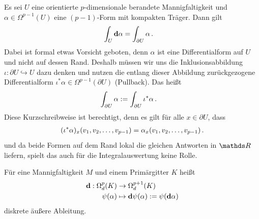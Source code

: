   \begin{satz}
    Es sei \( U \) eine orientierte \( p \)-dimensionale berandete Mannigfaltigkeit und \( \alpha\in\Omega^{p-1}(U) \) eine \( (p-1)\)-Form
    mit kompakten Träger.
    Dann gilt
    \begin{align}
      \int_{U} \mathbf{d}\alpha &= \int_{\partial U} \alpha \,\text{.}
    \end{align}
    Dabei ist formal etwas Vorsicht geboten, denn \( \alpha \) ist eine Differentialform auf \( U \) und nicht auf dessen Rand.
    Deshalb müssen wir uns die Inklusionsabbildung \( \iota:\partial U \hookrightarrow U \) dazu denken und nutzen die entlang dieser Abbildung
    zurückgezogene Differentialform \( \iota^{*}\alpha\in\Omega^{p-1}(\partial U) \) (Pullback).
    Das heißt
    \begin{align}
      \int_{\partial U} \alpha &:= \int_{\partial U} \iota^{*}\alpha \,\text{.}
    \end{align}
    Diese Kurzschreibweise ist berechtigt, denn es gilt für alle \( x\in\partial U \), dass
    \begin{align}
    \label{eqPullbackEntlangInklusion}
      (\iota^{*}\alpha)_{x}(v_{1},v_{2},\ldots,v_{p-1}) = \alpha_{x}(v_{1},v_{2},\ldots,v_{p-1}) \,\text{.}
    \end{align}
    und da beide Formen auf dem Rand lokal die gleichen Antworten in \( \R \) liefern, spielt das auch für die Integralauswertung keine Rolle.
  \end{satz}

  \begin{definition}
    \label{defAeussereAbleitung}
    Für eine Mannigfaltigkeit \( M \) und einem Primärgitter \( K \) heißt 
    \begin{align}
      \label{eqAeussereAbleitung}
      \begin{aligned}
        \mathbf{d} : \Omega^{p}_{d}(K) &\rightarrow \Omega^{p+1}_{d}(K) \\
               \psi(\alpha) &\mapsto \mathbf{d}\psi(\alpha):=\psi(\mathbf{d} \alpha)
      \end{aligned}
    \end{align}
    diskrete äußere Ableitung.
  \end{definition}
    

